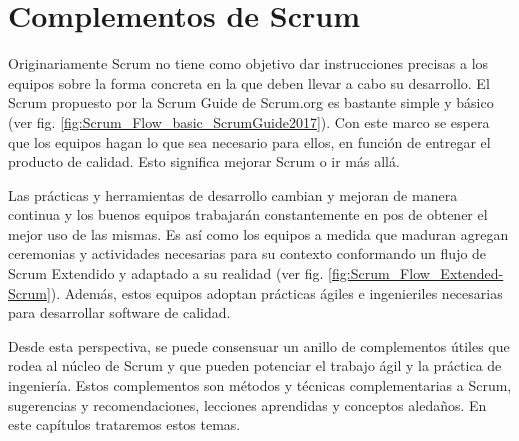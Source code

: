 \chapter{Complementos de Scrum}

Originariamente Scrum no tiene como objetivo dar instrucciones precisas a los equipos sobre la forma concreta en la que deben llevar a cabo su desarrollo. El Scrum propuesto por la Scrum Guide de Scrum.org es bastante simple y básico (ver fig. \ref{fig:Scrum_Flow_basic_ScrumGuide2017}). Con este marco se espera que los equipos hagan lo que sea necesario para ellos, en función de entregar el producto de calidad. Esto significa mejorar Scrum o ir más allá.

Las prácticas y herramientas de desarrollo cambian y mejoran de manera continua y los buenos equipos trabajarán constantemente en pos de obtener el mejor uso de las mismas. Es así como los equipos a medida que maduran agregan ceremonias y actividades necesarias para su contexto conformando un flujo de Scrum Extendido y adaptado a su realidad (ver fig. \ref{fig:Scrum_Flow_Extended-Scrum}). Además, estos equipos adoptan prácticas ágiles e ingenieriles necesarias para desarrollar software de calidad.

Desde esta perspectiva, se puede consensuar un anillo de complementos útiles que rodea al núcleo de Scrum y que pueden potenciar el trabajo ágil y la práctica de ingeniería. Estos complementos son métodos y técnicas complementarias a Scrum, sugerencias y recomendaciones, lecciones aprendidas y conceptos aledaños. En este capítulos trataremos estos temas.



